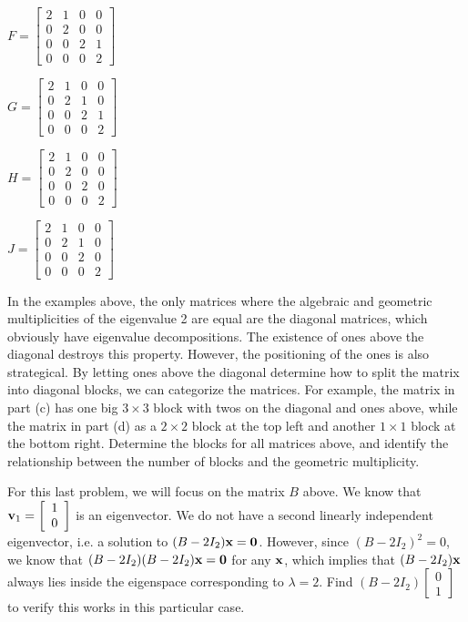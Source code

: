 \begin{pa}
\item $F = \left[ \begin{array}{cccc} 2&1&0&0 \\ 0&2&0&0 \\ 0&0&2&1\\ 0&0&0&2 \end{array} \right]$

\item $G = \left[ \begin{array}{cccc} 2&1&0&0 \\ 0&2&1&0 \\ 0&0&2&1\\ 0&0&0&2 \end{array} \right]$

\item $H = \left[ \begin{array}{cccc} 2&1&0&0 \\ 0&2&0&0 \\ 0&0&2&0\\ 0&0&0&2 \end{array}\right]$

\item $J = \left[ \begin{array}{cccc} 2&1&0&0 \\ 0&2&1&0 \\ 0&0&2&0\\ 0&0&0&2 \end{array} \right]$
\ea

\item In the examples above, the only matrices where the algebraic and geometric multiplicities of the eigenvalue 2 are equal are the diagonal matrices, which obviously have eigenvalue decompositions. The existence of ones above the diagonal destroys this property. However, the positioning of the ones is also strategical. By letting ones above the diagonal determine how to split the matrix into diagonal blocks, we can categorize the matrices. For example, the matrix in part (c) has one big $3\times 3$ block with twos on the diagonal and ones above, while the matrix in part (d) as a $2\times 2$ block at the top left and another $1\times 1$ block at the bottom right. Determine the blocks for all matrices above, and identify the relationship between the number of blocks and the geometric multiplicity.

\item For this last problem, we will focus on the matrix $B$ above. We know that $\mathbf{v}_1 = \left[ \begin{array}{c} 1 \\ 0  \end{array}\right]$ is an eigenvector. We do not have a second linearly independent eigenvector, i.e. a solution to $(B-2I_2)\mathbf{x}=\mathbf{0}$. However, since $(B-2I_2)^2=0$, we know that $(B-2I_2)(B-2I_2)\mathbf{x} = \mathbf{0}$ for any $\mathbf{x}$, which implies that $(B-2I_2)\mathbf{x}$ always lies inside the eigenspace corresponding to $\lambda=2$. Find $(B-2I_2)\left[ \begin{array}{c} 0 \\ 1  \end{array}\right]$ to verify this works in this particular case.

\ee
\end{pa}

